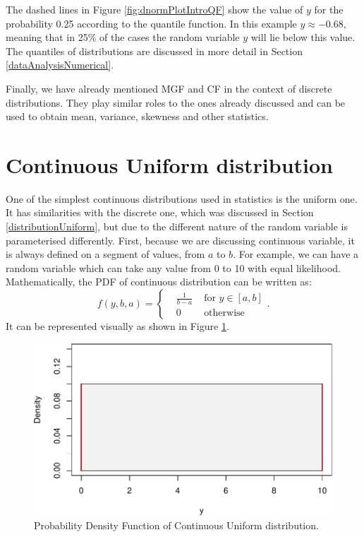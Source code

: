 \documentclass[
]{book}
\theoremstyle{definition}
\theoremstyle{definition}
\theoremstyle{definition}
\theoremstyle{definition}
\theoremstyle{remark}
\begin{document}
The dashed lines in Figure \ref{fig:dnormPlotIntroQF} show the value of \(y\) for the probability 0.25 according to the quantile function. In this example \(y \approx -0.68\), meaning that in 25\% of the cases the random variable \(y\) will lie below this value. The quantiles of distributions are discussed in more detail in Section \ref{dataAnalysisNumerical}.

Finally, we have already mentioned MGF and CF in the context of discrete distributions. They play similar roles to the ones already discussed and can be used to obtain mean, variance, skewness and other statistics.

\hypertarget{distributionsUniformContinuous}{%
\section{Continuous Uniform distribution}\label{distributionsUniformContinuous}}

One of the simplest continuous distributions used in statistics is the uniform one. It has similarities with the discrete one, which was discussed in Section \ref{distributionUniform}, but due to the different nature of the random variable is parameterised differently. First, because we are discussing continuous variable, it is always defined on a segment of values, from \(a\) to \(b\). For example, we can have a random variable which can take any value from 0 to 10 with equal likelihood. Mathematically, the PDF of continuous distribution can be written as:
\begin{equation}
    f(y, b, a) = \left\{\begin{aligned}
                        & \frac{1}{b-a} & \text{ for } y \in [a, b] \\
                        & 0 & \text{ otherwise }
                    \end{aligned} \right. .
    \label{eq:ContinuousUniformPDF}
\end{equation}
It can be represented visually as shown in Figure \ref{fig:uniformPDF}.

\begin{figure}
\centering
\includegraphics{Svetunkov---Statistics-for-Business-Analytics_files/figure-latex/uniformPDF-1.pdf}
\caption{\label{fig:uniformPDF}Probability Density Function of Continuous Uniform distribution.}
\end{figure}
\end{document}
